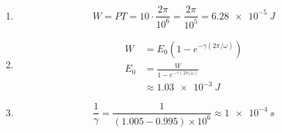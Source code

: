 \documentclass{article}
\begin{document}
\setcounter{subsection}{16}
\subsection{}

\begin{enumerate}
  \item \[W = P T = 10 \cdot \frac{2 \pi}{10^6} = \frac{2 \pi}{10^5} = \qty{6.28e-5}{J}\]

  \item

        \begin{align*}
          W   & = E_0 (1 - e^{-\gamma (2 \pi / \omega)})     \\
          E_0 & = \frac{W}{1 - e^{-\gamma (2 \pi / \omega)}} \\
              & \approx \qty{1.03e-3}{J}
        \end{align*}

  \item \[\frac{1}{\gamma} = \frac{1}{(1.005 - 0.995) \times 10^6} \approx \qty{1e-4}{s}\]
\end{enumerate}
\end{document}

